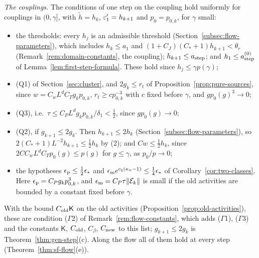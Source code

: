 \begin{remark}[Parameters]
\emph{The couplings.} The conditions of one step on the coupling hold uniformly for couplings in $(0,\gamma]$, with $\tilde h=h_k$, $\varepsilon'_1=h_{k+1}$ and $p_0=p_{0,k}$, for $\gamma$ small:
\begin{itemize}
\item the thresholds: every $h_j$ is an admissible threshold (Section~\ref{subsec:flow-parameters}), which includes $h_k\le a_1$ and $(1+C_J)(C_*+1)h_{k+1}<\theta_r$ (Remark~\ref{rem:domain-constants}, the coupling); $h_{k+1}\le a_{\rm step}$; and $h_1\le a^{(0)}_{\rm step}$ of Lemma~\ref{lem:first-step-formula}. These hold since $h_j\le\gamma p(\gamma)$;
\item (Q1) of Section~\ref{sec:cluster}, and $2g_k\le r_t$ of Proposition~\ref{prop:pure-sources}, since $w=C_wL^dC_Tg_kp_{0,k}$, $r_t\ge cp_{0,k}^{-3}$ with $c$ fixed before $\gamma$, and $gp_0(g)^3\to0$;
\item (Q3), i.e.\ $\tau\le C_PL^dg_kp_{0,k}/\delta_1<\frac12$, since $gp_0(g)\to0$;
\item (Q2), if $g_{k+1}\le2g_k$. Then $h_{k+1}\le2h_k$ (Section~\ref{subsec:flow-parameters}), so $2(C_*+1)L^{-2}h_{k+1}\le\frac12h_k$ by (2); and $Cw\le\frac12h_k$, since $2CC_wL^dC_Tp_0(g)\le p(g)$ for $g\le\gamma$, as $p_0/p\to0$;
\item the hypotheses $\epsilon_{\rm p}\le\frac12\epsilon_*$ and $\epsilon_{\rm m}e^{c_\natural(\kappa_n-1)}\le\frac14\epsilon_*$ of Corollary~\ref{cor:two-classes}. Here $\epsilon_{\rm p}=C_Pg_kp_{0,k}^3$, and $\epsilon_{\rm m}=C_P\tau\|\mathcal E_k\|$ is small if the old activities are bounded by a constant fixed before $\gamma$.
\end{itemize}
With the bound $C_{\rm old}\mathsf K$ on the old activities (Proposition~\ref{prop:old-activities}), these are condition ($\Gamma$2) of Remark~\ref{rem:flow-constants}, which adds ($\Gamma$1), ($\Gamma$3) and the constants $\mathsf K$, $C_{\rm old}$, $C_\beta$, $C_{\rm new}$ to this list; $g_{k+1}\le2g_k$ is Theorem~\ref{thm:gen-step}(c). Along the flow all of them hold at every step (Theorem~\ref{thm:sf-flow}(e)).
\end{remark}

